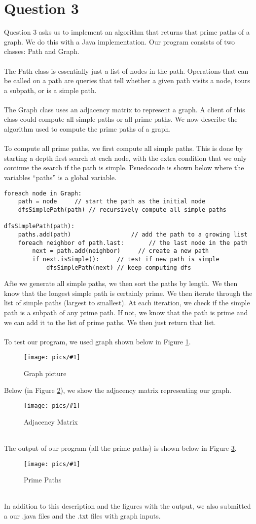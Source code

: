 \documentclass{article}
\newcommand{\fig}[3]{ 
	\begin{figure}[h]
		\centering
		\caption{#3}
		\texttt{[image: pics/\#1]}
		\label{fig:#1}
	\end{figure} 
}
\begin{document}
\section*{Question 3}
Question 3 asks us to implement an algorithm that returns that prime paths of a graph. We do this with a Java implementation. Our program consists of two classes: Path and Graph. \\\\
The Path class is essentially just a list of nodes in the path. Operations that can be called on a path are queries that tell whether a given path visits a node, tours a subpath, or is a simple path. \\\\
The Graph class uses an adjacency matrix to represent a graph. A client of this class could compute all simple paths or all prime paths. We now describe the algorithm used to compute the prime paths of a graph. \\\\
To compute all prime paths, we first compute all simple paths. This is done by starting a depth first search at each node, with the extra condition that we only continue the search if the path is simple. Psuedocode is shown below where the variables ``paths'' is a global variable.
\begin{Verbatim}
foreach node in Graph:
	path = node		// start the path as the initial node
	dfsSimplePath(path)	// recursively compute all simple paths
	
dfsSimplePath(path):
	paths.add(path)		            // add the path to a growing list
	foreach neighbor of path.last:	     // the last node in the path
		next = path.add(neighbor)	  // create a new path
		if next.isSimple():		// test if new path is simple
			dfsSimplePath(next)	// keep computing dfs
\end{Verbatim}
Afte we generate all simple paths, we then sort the paths by length. We then know that the longest simple path is certainly prime. We then iterate through the list of simple paths (largest to smallest). At each iteration, we check if the simple path is a subpath of any prime path. If not, we know that the path is prime and we can add it to the list of prime paths. We then just return that list. \\\\
To test our program, we used graph shown below in Figure \ref{fig:graph-rep}.
\fig{graph-rep}{0.25}{Graph picture} \newpage
Below (in Figure \ref{fig:adj-mtx}), we show the adjacency matrix representing our graph.
\fig{adj-mtx}{0.5}{Adjacency Matrix} \\
The output of our program (all the prime paths) is shown below in Figure \ref{fig:prime-paths}.
\fig{prime-paths}{0.5}{Prime Paths} \\
In addition to this description and the figures with the output, we also submitted a our .java files and the .txt files with graph inputs.
\end{document}

